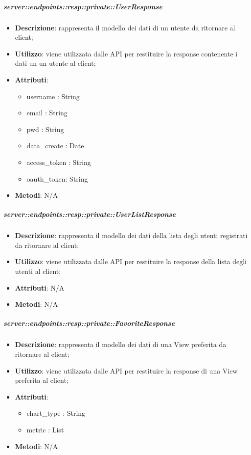     \subparagraph{server::endpoints::resp::private::UserResponse} %
    \label{subp:bdsm_app_server_endpoints_resp_private_userresponse}
    \begin{itemize}
      \item \textbf{Descrizione}: rappresenta il modello dei dati di un utente da ritornare al client;
      \item \textbf{Utilizzo}: viene utilizzata dalle API per restituire la response contenente i dati un un utente al client;
	  \item \textbf{Attributi}:
	  	\begin{itemize}
	  		\item username : String
	  		\item email : String
	  		\item pwd : String
	  		\item data\_create : Date
	  		\item access\_token : String
	  		\item oauth\_token: String
	  	\end{itemize}
	  \item \textbf{Metodi}: N/A
    \end{itemize}

    \subparagraph{server::endpoints::resp::private::UserListResponse} %
    \label{subp:bdsm_app_server_endpoints_resp_private_userlistresponse}
    \begin{itemize}
      \item \textbf{Descrizione}: rappresenta il modello dei dati della lista degli utenti registrati da ritornare al client;
      \item \textbf{Utilizzo}: viene utilizzata dalle API per restituire la response della lista degli utenti al client;
	  \item \textbf{Attributi}: N/A
	  \item \textbf{Metodi}: N/A
    \end{itemize}

    \subparagraph{server::endpoints::resp::private::FavoriteResponse} %
    \label{subp:bdsm_app_server_endpoints_resp_private_favoriteresponse}
    \begin{itemize}
      \item \textbf{Descrizione}: rappresenta il modello dei dati di una View preferita da ritornare al client;
      \item \textbf{Utilizzo}: viene utilizzata dalle API per restituire la response di una View preferita al client;
	  \item \textbf{Attributi}:
	  	\begin{itemize}
	  		\item chart\_type : String
	  		\item metric : List
	  	\end{itemize}
	  \item \textbf{Metodi}: N/A
    \end{itemize}

